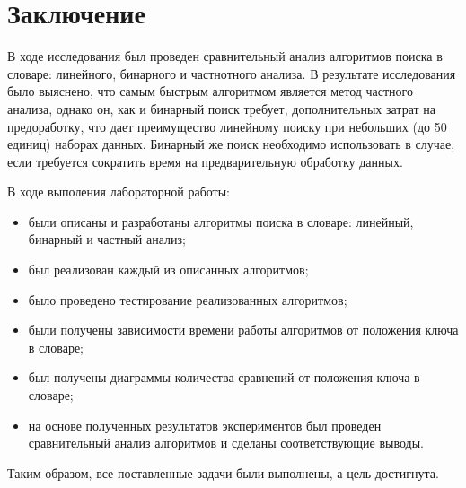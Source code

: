 \chapter*{Заключение}

В ходе исследования был проведен сравнительный анализ алгоритмов поиска в
словаре: линейного, бинарного и частнотного анализа. В результате исследования
было выяснено, что самым быстрым алгоритмом является метод частного анализа,
однако он, как и бинарный поиск требует, дополнительных затрат на предоработку,
что дает преимущество линейному поиску при небольших (до 50 единиц) наборах
данных. Бинарный же поиск необходимо использовать в случае, если требуется
сократить время на предварительную обработку данных.

В ходе выполения лабораторной работы:
\begin{itemize}[left=\parindent]
    \item были описаны и разработаны алгоритмы поиска в словаре: линейный,
        бинарный и частный анализ;
    \item был реализован каждый из описанных алгоритмов;
    \item было проведено тестирование реализованных алгоритмов;
    \item были получены зависимости времени работы алгоритмов от положения
        ключа в словаре;
    \item был получены диаграммы количества сравнений от положения ключа в
        словаре;
    \item на основе полученных результатов экспериментов был проведен
        сравнительный анализ алгоритмов и сделаны соответствующие выводы.
\end{itemize}

Таким образом, все поставленные задачи были выполнены, а цель достигнута.
